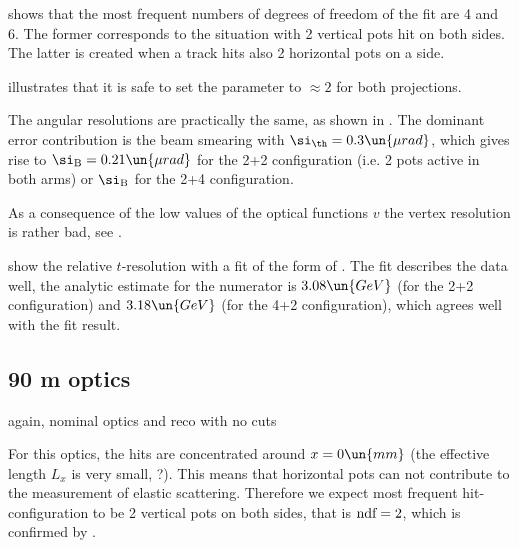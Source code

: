  shows that the most frequent numbers of degrees of freedom of the fit  are 4 and 6. The former corresponds to the situation with 2 vertical pots hit on both sides. The latter is created when a track hits also 2 horizontal pots on a side.

 illustrates that it is safe to set the  parameter to $\approx 2$ for both projections.

\bmfig
{}
\emfig

The angular resolutions are practically the same, as shown in . The dominant error contribution is the beam smearing with $\si_\th = 0.3\un{\mu rad}$, which gives rise to $\si_{\rm B} = 0.21 \un{\mu rad}$ for the 2+2 configuration (i.e. 2 pots active in both arms) or $\si_{\rm B}$ for the 2+4 configuration.

As a consequence of the low values of the optical functions $v$ the vertex resolution is rather bad, see .

\bmfig
{}
\emfig

 show the relative $t$-resolution with a fit of the form of . The fit describes the data well, the analytic estimate for the numerator is $3.08\un{GeV}$ (for the 2+2 configuration) and $3.18\un{GeV}$ (for the 4+2 configuration), which agrees well with the fit result.



\subsection[elr 90]{90 m optics}

\> again, nominal optics and reco with no cuts

For this optics, the hits are concentrated around $x=0\un{mm}$ (the effective length $L_x$ is very small, ?). This means that horizontal pots can not contribute to the measurement of elastic scattering. Therefore we expect most frequent hit-configuration to be 2 vertical pots on both sides, that is $\hbox{ndf}=2$, which is confirmed by .

